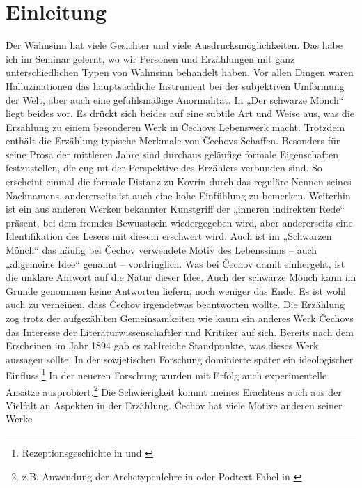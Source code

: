 \documentclass[12pt,headsepline,a4paper]{scrartcl}
\begin{document}
\section*{Einleitung}
Der Wahnsinn hat viele Gesichter und viele Ausdrucksmöglichkeiten. Das habe ich im Seminar
gelernt, wo wir Personen und Erzählungen mit ganz unterschiedlichen Typen von Wahnsinn
behandelt haben. Vor allen Dingen waren Halluzinationen das hauptsächliche Instrument bei der
subjektiven Umformung der Welt, aber auch eine gefühlsmäßige Anormalität. In „Der schwarze
Mönch“ liegt beides vor. Es drückt sich beides auf eine subtile Art und Weise aus, was die
Erzählung zu einem besonderen Werk in Čechovs Lebenswerk macht.
Trotzdem enthält die Erzählung typische Merkmale von Čechovs Schaffen. Besonders für seine
Prosa der mittleren Jahre sind durchaus geläufige formale Eigenschaften festzustellen, die eng mt
der Perspektive des Erzählers verbunden sind. So erscheint einmal die formale Distanz zu Kovrin
durch das reguläre Nennen seines Nachnamens, andererseits ist auch eine hohe Einfühlung zu
bemerken.\autocite[76]{hielscher} Weiterhin ist ein aus anderen Werken bekannter Kunstgriff der „inneren indirekten
Rede“ präsent, bei dem fremdes Bewusstsein wiedergegeben wird, aber andererseits eine
Identifikation des Lesers mit diesem erschwert wird.\autocite[81]{hielscher} Auch ist im „Schwarzen Mönch“ das häufig
bei Čechov verwendete Motiv des Lebenssinns – auch „allgemeine Idee“ genannt – vordringlich.
Was bei Čechov damit einhergeht, ist die unklare Antwort auf die Natur dieser Idee. Auch der
schwarze Mönch kann im Grunde genommen keine Antworten liefern, noch weniger das Ende.\autocite{freise97}\autocite{sonnleitner} Es
ist wohl auch zu verneinen, dass Čechov irgendetwas beantworten wollte.\autocite{winner}
Die Erzählung zog trotz der aufgezählten Gemeinsamkeiten wie kaum ein anderes Werk Čechovs
das Interesse der Literaturwissenschaftler und Kritiker auf sich. Bereits nach dem Erscheinen im
Jahr 1894 gab es zahlreiche Standpunkte, was dieses Werk aussagen sollte. In der sowjetischen
Forschung dominierte später ein ideologischer Einfluss.\footnote{Rezeptionsgeschichte in \autocite{meve} und \autocite{kataev}} In der neueren Forschung wurden mit
Erfolg auch experimentelle Ansätze ausprobiert.\footnote{z.B. Anwendung der Archetypenlehre in \autocite{woern} oder Podtext-Fabel
in \autocite{freise97}
} Die Schwierigkeit kommt meines Erachtens auch
aus der Vielfalt an Aspekten in der Erzählung.\autocite[108]{kluge}
Čechov hat viele Motive anderen seiner Werke
\end{document}
